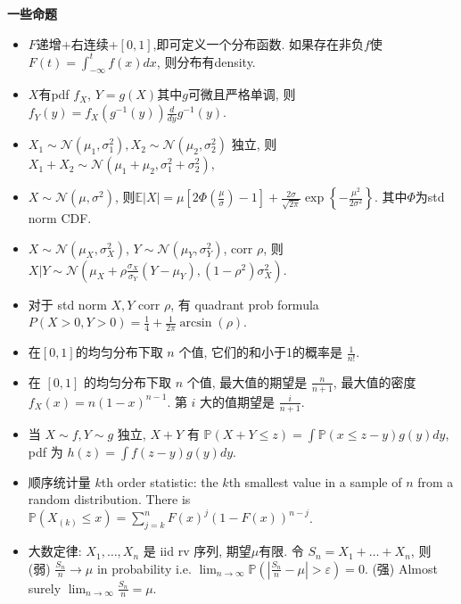 \documentclass[UTF8]{ctexart}
\begin{document}
\noindent \textbf{一些命题}
\begin{itemize}

\item $F$递增+右连续+$[0,1]$,即可定义一个分布函数.
	如果存在非负$f$使$F(t)=\int_{-\infty}^t f(x)dx$, 则分布有density.

\item $X$有pdf $f_X$, $Y=g(X)$其中$g$可微且严格单调, 则$f_Y(y)=f_X(g^{-1}(y))\frac{d}{dy}g^{-1}(y)$.

\item $X_1\sim \mathcal{N}(\mu_1,\sigma_1^2), X_2\sim \mathcal{N}(\mu_2,\sigma_2^2)$ 独立, 
	则$X_1+X_2\sim \mathcal{N}(\mu_1+\mu_2,\sigma_1^2+\sigma_2^2), $

\item $X\sim \mathcal{N}(\mu,\sigma^2)$,
	则$\mathbb{E}|X|=\mu\left[2 \Phi\left(\frac{\mu}{\sigma}\right)-1\right]+
		\frac{2 \sigma}{\sqrt{2 \pi}} \exp \left\{-\frac{\mu^{2}}{2 \sigma^{2}}\right\}$.
	其中$\Phi$为std norm CDF.

\item $X\sim\mathcal{N}(\mu_X,\sigma_X^2)$, $Y\sim\mathcal{N}(\mu_Y,\sigma_Y^2)$, corr $\rho$,
	则 $X|Y \sim \mathcal{N}\left(\mu_X+\rho\frac{\sigma_X}{\sigma_Y}(Y-\mu_Y),(1-\rho^2)\sigma_X^2\right)$.

\item 对于 std norm $X,Y$ corr $\rho$, 有 quadrant prob formula $P(X>0, Y>0) = \frac{1}{4}+\frac{1}{2\pi}\arcsin(\rho)$.

\item 在$[0,1]$的均匀分布下取 $n$ 个值, 它们的和小于1的概率是 $\frac{1}{n!}$.

\item 在 $[0,1]$ 的均匀分布下取 $n$ 个值, 最大值的期望是 $\frac{n}{n+1}$,
	最大值的密度 $f_X(x) = n(1-x)^{n-1}$.
	第 $i$ 大的值期望是 $\frac{i}{n+1}$.

\item 当 $X\sim f,Y\sim g$ 独立, $X+Y$ 有
	$\mathbb{P} (X+Y\leq z)=\int\mathbb{P}(x\leq z-y)g(y)dy$,
	pdf 为 $h(z)=\int f(z-y)g(y)dy$.

\item 顺序统计量 $k$th order statistic: the $k$th smallest value in a sample of $n$ from a random distribution.
	There is $\mathbb{P}(X_{(k)}\leq x)=\sum_{j=k}^n F(x)^j (1-F(x))^{n-j}$.

\item 大数定律:
	$X_1,\dots,X_n$ 是 iid rv 序列, 期望$\mu$有限.
	令 $S_n = X_1+\dots+X_n$, 则
	(弱) $\frac{S_n}{n}\to\mu$ in probability i.e.
	$\lim_{n\to\infty}\mathbb{P}(|\frac{S_n}{n}-\mu|>\varepsilon)=0$.
	(强) Almost surely $\lim_{n\to\infty}\frac{S_n}{n}=\mu$.


\end{itemize}
\end{document}
